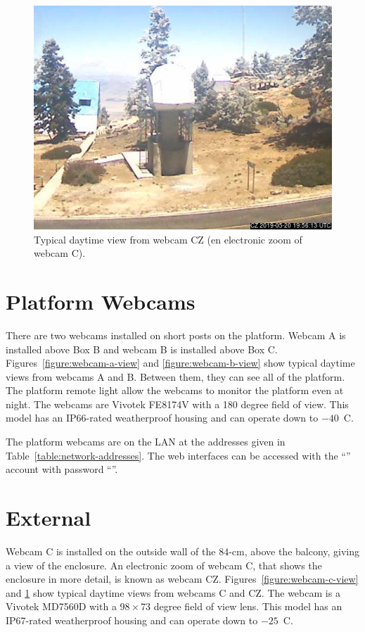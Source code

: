 \begin{figure}[t]
\begin{center}
\fi
\ifddoti
\includegraphics[height=0.6\linewidth]{figures/ddoti-webcam-cz.jpg}
\fi
\end{center}
\caption{Typical daytime view from {\projectname} webcam CZ (en electronic zoom of webcam C).}
\label{figure:webcam-cz-view}
\end{figure}

\section{Platform Webcams}

There are two webcams installed on short posts on the platform. Webcam A is installed above Box B and webcam B is installed above Box C. Figures~\ref{figure:webcam-a-view} and \ref{figure:webcam-b-view} show typical daytime views from webcams A and B. Between them, they can see all of the platform. The platform remote light allow the webcams to monitor the platform even at night. The webcams are Vivotek FE8174V with a 180 degree field of view. This model has an IP66-rated weatherproof housing and can operate down to $-40$~C.

The platform webcams are on the LAN at the addresses given in Table~\ref{table:network-addresses}. The web interfaces can be accessed with the “\projectaccount” account with password “\projectaccount”.

\section{External}

Webcam C is installed on the outside wall of the 84-cm, above the balcony, giving a view of the {\projectname} enclosure. An electronic zoom of webcam C, that shows the enclosure in more detail, is known as webcam CZ. Figures~\ref{figure:webcam-c-view} and \ref{figure:webcam-cz-view} show typical daytime views from webcams C and CZ.
The webcam is a Vivotek MD7560D with a $98 \times 73$ degree field of view lens. This model has an IP67-rated weatherproof housing and can operate down to $-25$~C.

